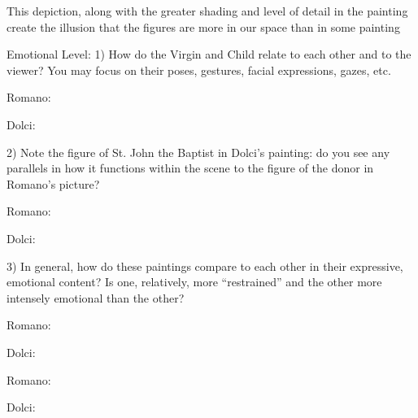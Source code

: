            This depiction, along with the greater shading and level of detail
            in the painting create the illusion that the figures are more in
            our space than in some painting


Emotional Level:
    1)  How do the Virgin and Child relate to each other and to the viewer?
        You may focus on their poses, gestures, facial expressions, gazes, etc.

        Romano:

        Dolci:


    2)  Note the figure of St. John the Baptist in Dolci’s painting:  do you
        see any parallels in how it functions within the scene to the figure of
        the donor in Romano’s picture?

        Romano:

        Dolci:


    3)  In general, how do these paintings compare to each other in their
        expressive, emotional content?  Is one, relatively, more “restrained”
        and the other more intensely emotional than the other?

        Romano:

        Dolci:


Romano:

Dolci:

